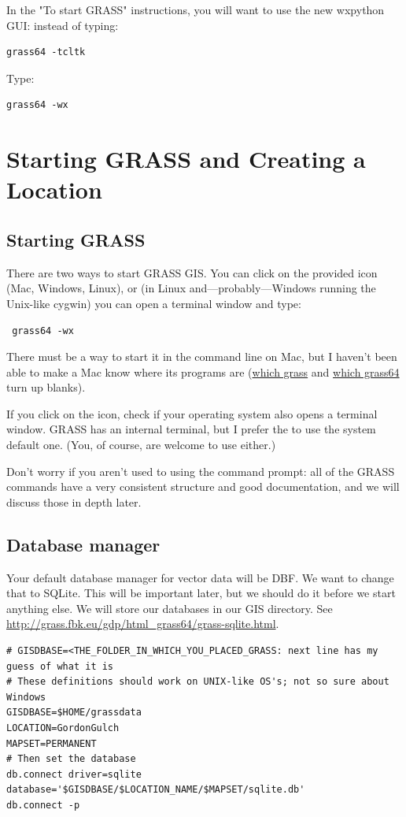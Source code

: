 \documentclass{book}
\begin{document}
In the "To start GRASS" instructions, you will want to use the new wxpython GUI: instead of typing:
\begin{lstlisting}
grass64 -tcltk
\end{lstlisting}
\noindent Type:
\begin{lstlisting}
grass64 -wx
\end{lstlisting}


\chapter{Starting GRASS and Creating a Location}

\section{Starting GRASS}

There are two ways to start GRASS GIS. You can click on the provided icon (Mac, Windows, Linux), or (in Linux and---probably---Windows running the Unix-like cygwin) you can open a terminal window and type:
\begin{lstlisting}
 grass64 -wx
\end{lstlisting}
There must be a way to start it in the command line on Mac, but I haven't been able to make a Mac know where its programs are (\url{which grass} and \url{which grass64} turn up blanks).

If you click on the icon, check if your operating system also opens a terminal window. GRASS has an internal terminal, but I prefer the to use the system default one. (You, of course, are welcome to use either.)

Don't worry if you aren't used to using the command prompt: all of the GRASS commands have a very consistent structure and good documentation, and we will discuss those in depth later.

\section{Database manager \label{s:database}}

Your default database manager for vector data will be DBF. We want to change that to SQLite. This will be important later, but we should do it before we start anything else. We will store our databases in our GIS directory. See \url{http://grass.fbk.eu/gdp/html_grass64/grass-sqlite.html}.

\begin{lstlisting}
# GISDBASE=<THE_FOLDER_IN_WHICH_YOU_PLACED_GRASS: next line has my guess of what it is
# These definitions should work on UNIX-like OS's; not so sure about Windows
GISDBASE=$HOME/grassdata
LOCATION=GordonGulch
MAPSET=PERMANENT
# Then set the database
db.connect driver=sqlite database='$GISDBASE/$LOCATION_NAME/$MAPSET/sqlite.db'
db.connect -p
\end{lstlisting}
\end{document}
